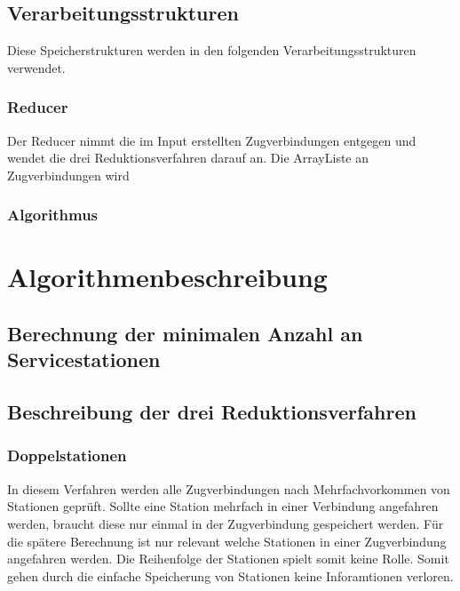 

\subsection{Verarbeitungsstrukturen}\label{ver:subsec:verarbeitungsstrukturen}
Diese Speicherstrukturen werden in den folgenden Verarbeitungsstrukturen verwendet.\\
\subsubsection{Reducer}\label{ver:subsubsec:reducer}
Der Reducer nimmt die im Input erstellten Zugverbindungen entgegen und wendet die drei Reduktionsverfahren darauf an. Die ArrayListe an Zugverbindungen wird \\
\subsubsection{Algorithmus}\label{ver:subsubsec:algorithmus}

\section{Algorithmenbeschreibung}\label{ver:sec:verfahren}
\subsection{Berechnung der minimalen Anzahl an Servicestationen}\label{ver:subsec:berechnung}

\subsection{Beschreibung der drei Reduktionsverfahren}
\subsubsection{Doppelstationen}\label{ver:subsubsec:doppelstationen}
In diesem Verfahren werden alle Zugverbindungen nach Mehrfachvorkommen von Stationen geprüft. Sollte eine Station mehrfach in einer Verbindung angefahren werden, braucht diese nur einmal in der Zugverbindung gespeichert werden. Für die spätere Berechnung ist nur relevant welche Stationen in einer Zugverbindung angefahren werden. Die Reihenfolge der Stationen spielt somit keine Rolle. Somit gehen durch die einfache Speicherung von Stationen keine Inforamtionen verloren.\\

